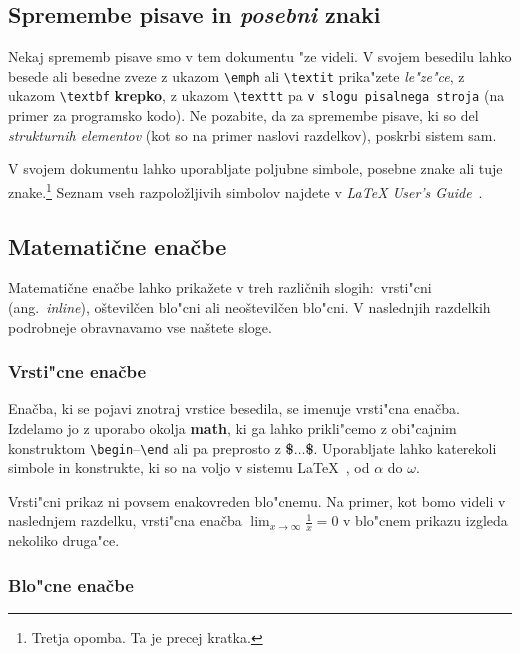 \documentclass[sigconf,nonacm]{acmart}
\begin{document}
\subsection{Spremembe pisave in \emph{posebni} znaki}

Nekaj sprememb pisave smo v tem dokumentu "ze videli.  V svojem besedilu lahko
besede ali besedne zveze z ukazom \texttt{\textbackslash{}emph} ali
\texttt{\textbackslash{}textit} prika"zete \emph{le"ze"ce}, z ukazom
\texttt{\textbackslash{}textbf} \textbf{krepko}, z ukazom
\texttt{\textbackslash{}texttt} pa \texttt{v slogu pisalnega stroja} (na
primer za programsko kodo).  Ne pozabite, da za spremembe pisave, ki so del
\emph{strukturnih elementov} (kot so na primer naslovi razdelkov), poskrbi
sistem sam.

V svojem dokumentu lahko uporabljate poljubne simbole, posebne znake
ali tuje znake.\footnote{Tretja opomba. Ta je precej kratka.} Seznam vseh
razpoložljivih simbolov najdete v \emph{\LaTeX{} User's
Guide}~\cite{Lamport:LaTeX}.

\subsection{Matematične enačbe}

Matematične enačbe lahko prikažete v treh različnih slogih:\ vrsti"cni (ang.\
\emph{inline}), oštevilčen blo"cni ali neoštevilčen blo"cni.  V naslednjih
razdelkih podrobneje obravnavamo vse naštete sloge.

\subsubsection{Vrsti"cne enačbe}

Enačba, ki se pojavi znotraj vrstice besedila, se imenuje vrsti"cna enačba.
Izdelamo jo z uporabo okolja \textbf{math}, ki ga lahko prikli"cemo z
obi"cajnim konstruktom
\texttt{\textbackslash{}begin}--\texttt{\textbackslash{}end} ali pa preprosto
z \textbf{\$$\ldots$\$}.  Uporabljate lahko katerekoli simbole in konstrukte,
ki so na voljo v sistemu \LaTeX~\cite{Lamport:LaTeX}, od $\alpha$ do $\omega$.

Vrsti"cni prikaz ni povsem enakovreden blo"cnemu. Na primer, kot bomo videli
v naslednjem razdelku, vrsti"cna enačba
\begin{math}\lim_{x\rightarrow \infty}\frac{1}{x}=0\end{math} 
v blo"cnem prikazu izgleda nekoliko druga"ce.

\subsubsection{Blo"cne enačbe}
\end{document}
